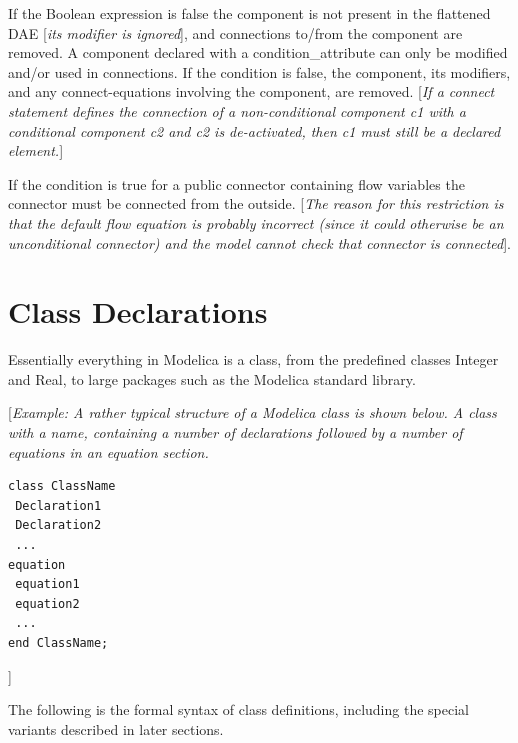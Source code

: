 \documentclass[10pt,a4paper]{report}
\def\Mcomment#1{{[}\emph{#1}{]}}
\def\Mcommentbegin#1{{[}\emph{#1}}
\def\Mcommentend#1{\emph{#1}{]}}
\begin{document}
If the Boolean expression is false the component is not present in the
flattened DAE \Mcomment{its modifier is ignored}, and connections
to/from the component are removed. A component declared with a
condition\_attribute can only be modified and/or used in connections. If
the condition is false, the component, its modifiers, and any
connect-equations involving the component, are removed. \Mcomment{If a
connect statement defines the connection of a non-conditional component
c1 with a conditional component c2 and c2 is de-activated, then c1 must
still be a declared element.}

If the condition is true for a public connector containing flow
variables the connector must be connected from the outside. \Mcomment{The
reason for this restriction is that the default flow equation is
probably incorrect (since it could otherwise be an unconditional
connector) and the model cannot check that connector is connected}.

\section{Class Declarations}

Essentially everything in Modelica is a class, from the predefined
classes Integer and Real, to large packages such as the Modelica
standard library.

\Mcommentbegin{Example: A rather typical structure of a Modelica class is
shown below. A class with a name, containing a number of declarations
followed by a number of equations in an equation section.}
\begin{lstlisting}[language=modelica]
class ClassName
 Declaration1
 Declaration2
 ...
equation
 equation1
 equation2
 ...
end ClassName;
\end{lstlisting}
\Mcommentend{}

The following is the formal syntax of class definitions, including the
special variants described in later sections.
\end{document}
